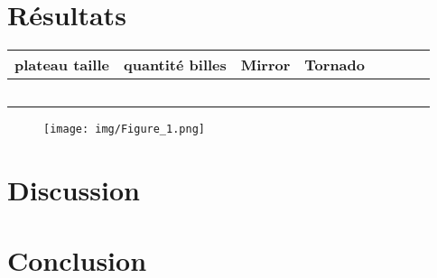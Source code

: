 \documentclass[utf8]{article}
\begin{document}
\section{Résultats}
\begin{center}
\begin{tabular}{|c|c|c|c|
                |c|c|c|c|}
\hline
plateau taille & quantité billes & Mirror & Tornado \\
\hline
              &                &       &\\
             &                &               & \\
             &                &               & \\
             &                &               & \\
\hline
             &                &              & \\
\hline
\end{tabular}
\end{center}



\begin{figure}[H]
  \centering
	\texttt{[image: img/Figure\_1.png]}
  \label{fig:logo}
\end{figure}

\newpage

\section{Discussion}
    

\section{Conclusion}
\end{document}
